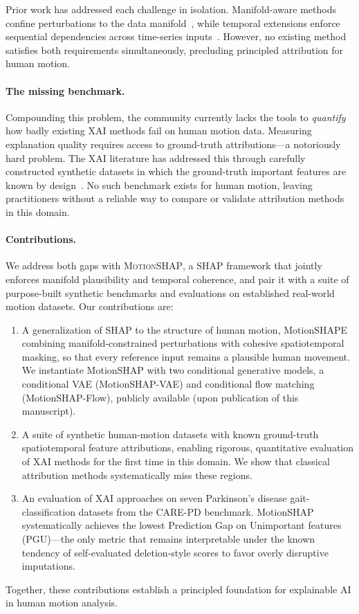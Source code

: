 Prior work has addressed each challenge in isolation. Manifold-aware methods confine perturbations to the data manifold~\citep{frye2020shapley,taufiq2023manifold,olsen2022using}, while temporal extensions enforce sequential dependencies across time-series inputs~\citep{bento2021timeshap,tempel2025explaining,NAYEBI2023104438}. However, no existing method satisfies both requirements simultaneously, precluding principled attribution for human motion.

\paragraph{The missing benchmark.}
Compounding this problem, the community currently lacks the tools to
\emph{quantify} how badly existing XAI methods fail on human motion
data.  Measuring explanation quality requires access to ground-truth
attributions---a notoriously hard problem.
The XAI literature has addressed this through carefully constructed
synthetic datasets in which the ground-truth important features are
known by design~\citep{arras2022clevr,hedstrom2023quantus,Yang2019BenchmarkingAM}.
No such benchmark exists for human motion, leaving practitioners without
a reliable way to compare or validate attribution methods in this domain.

\paragraph{Contributions.}
We address both gaps with \textsc{MotionSHAP}, a SHAP framework that jointly enforces manifold plausibility and temporal coherence, and pair it with a suite of purpose-built synthetic benchmarks and evaluations on established real-world motion datasets. Our contributions are:
\begin{enumerate}[leftmargin=*]
    \item A generalization of SHAP to the structure of human motion, MotionSHAPE
    combining manifold-constrained perturbations with cohesive
    spatiotemporal masking, so that every reference input remains a
    plausible human movement. We instantiate MotionSHAP with two conditional generative models, a conditional VAE (MotionSHAP-VAE) and conditional flow matching (MotionSHAP-Flow), publicly available (upon publication of this manuscript).
    \item A suite of synthetic human-motion datasets with known ground-truth
    spatiotemporal feature attributions, enabling rigorous, quantitative evaluation of XAI
    methods for the first time in this domain. We show that classical attribution methods systematically miss these regions.
    \item An evaluation of XAI approaches on seven Parkinson’s disease gait-classification datasets from the CARE-PD benchmark. MotionSHAP systematically achieves the lowest Prediction Gap on Unimportant features (PGU)—the only metric that remains interpretable under the known tendency of self-evaluated deletion-style scores to favor overly disruptive imputations.
\end{enumerate}
Together, these contributions establish a principled foundation for
explainable AI in human motion analysis.